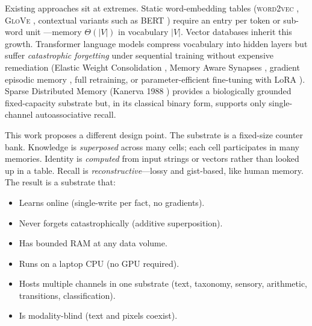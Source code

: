 \documentclass[11pt,a4paper]{article}
\begin{document}
Existing approaches sit at extremes.  Static word-embedding tables
(\textsc{word2vec} \cite{mikolov2013distributed}, \textsc{GloVe}
\cite{pennington2014glove}, contextual variants such as BERT
\cite{devlin2019bert}) require an entry per token or sub-word unit
\cite{sennrich2016neural}---memory $\Theta(|V|)$ in vocabulary $|V|$.
Vector databases inherit this growth.  Transformer language models
\cite{vaswani2017attention,brown2020gpt3} compress vocabulary into hidden
layers but suffer \emph{catastrophic forgetting} under sequential training
\cite{mccloskey1989catastrophic,french1999catastrophic} without
expensive remediation (Elastic Weight Consolidation
\cite{kirkpatrick2017overcoming}, Memory Aware Synapses
\cite{aljundi2018memory}, gradient episodic memory
\cite{lopez2017gradient}, full retraining, or parameter-efficient
fine-tuning with LoRA \cite{hu2022lora}).  Sparse Distributed Memory
(Kanerva 1988 \cite{kanerva1988sparse}) provides a biologically grounded
fixed-capacity substrate but, in its classical binary form, supports only
single-channel autoassociative recall.

This work proposes a different design point.  The substrate is a
fixed-size counter bank.  Knowledge is \emph{superposed} across many
cells;  each cell participates in many memories.  Identity is
\emph{computed} from input strings or vectors rather than looked up in a
table.  Recall is \emph{reconstructive}---lossy and gist-based, like
human memory.  The result is a substrate that:

\begin{itemize}
  \item Learns online (single-write per fact, no gradients).
  \item Never forgets catastrophically (additive superposition).
  \item Has bounded RAM at any data volume.
  \item Runs on a laptop CPU (no GPU required).
  \item Hosts multiple channels in one substrate (text, taxonomy, sensory,
        arithmetic, transitions, classification).
  \item Is modality-blind (text and pixels coexist).
\end{itemize}
\end{document}
